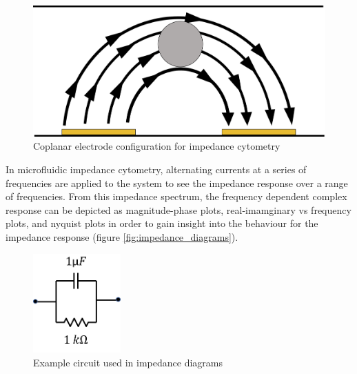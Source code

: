  
 \begin{figure}[ht]
     \centering
     \includegraphics[width=\textwidth]{images/coplanar.png}
     \caption{Coplanar electrode configuration for impedance cytometry}
     \label{fig:coplanar_electrodes}
 \end{figure}
 
 \par In microfluidic impedance cytometry, alternating currents at a series of frequencies are applied to the system to see the impedance response over a range of frequencies. From this impedance spectrum, the frequency dependent complex response can be depicted as magnitude-phase plots, real-imamginary vs frequency plots, and nyquist plots in order to gain insight into the behaviour for the impedance response (figure \ref{fig:impedance_diagrams}). 
 

\begin{figure}[ht]
    \centering
    \includegraphics[width=0.3\textwidth]{images/exampleCircuit.png}
    \caption{Example circuit used in impedance diagrams}
    \label{fig:example_circuit}
\end{figure} 
 
